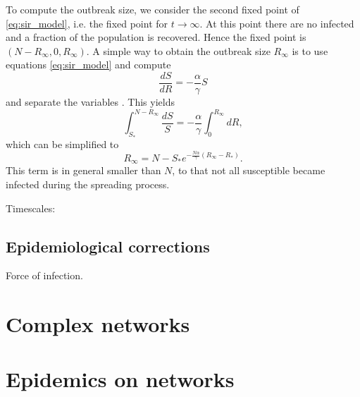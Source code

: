 To compute the outbreak size, we consider the second fixed point of \eqref{eq:sir_model}, i.e. the fixed point for $t \rightarrow \infty $.
At this point there are no infected and a fraction of the population is recovered.
Hence the fixed point is $(N-R_\infty , 0, R_\infty )$.
A simple way to obtain the outbreak size $R_\infty $ is to use equations \eqref{eq:sir_model} and compute 
$$
\frac{dS}{dR}=-\frac{\alpha }{\gamma } S 
$$
and separate the variables \cite{Chasnov:2010}.
This yields
$$
\int _{S_*} ^{N-R_\infty} \frac{dS}{S}=-\frac{\alpha }{\gamma } \int _{0} ^{R_\infty} dR ,
$$
which can be simplified to
$$
R_\infty = N-S_* e ^{-\frac{N\alpha}{\gamma}(R_\infty -R_*)}.
$$
This term is in general smaller than $N$, to that not all susceptible became infected during the spreading process.

Timescales:


\subsection{Epidemiological corrections}
Force of infection.



\section{Complex networks}



\section{Epidemics on networks}

%
